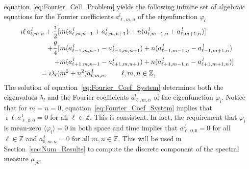 \documentclass[leqno,onefignum,onetabnum]{siamltex1213}
\newcommand{\secref}[1]{Section~\ref{#1}}
\begin{document}
equation~\eqref{eq:Fourier_Cell_Problem} yields the following infinite
set of algebraic equations for the Fourier coefficients $a^l_{\ell,m,n}$
of the eigenfunction $\varphi_l$ 
%
\begin{align}\label{eq:Fourier_Coef_System}
\imath \ell\,a^{\,l}_{\ell,m,n}+\frac{\imath}{2}
[&m(a^{\,l}_{\ell,m,n-1}+a^{\,l}_{\ell,m,n+1})+n(a^{\,l}_{\ell,m-1,n}+a^{\,l}_{\ell,m+1,n})]
\\
+\frac{\theta}{4}[&m(a^{\,l}_{\ell-1,m,n-1}-a^{\,l}_{\ell-1,m,n+1})+n(a^{\,l}_{\ell-1,m-1,n}-a^{\,l}_{\ell-1,m+1,n})
\notag\\
+&m(a^{\,l}_{\ell+1,m,n-1}-a^{\,l}_{\ell+1,m,n+1})+n(a^{\,l}_{\ell+1,m-1,n}-a^{\,l}_{\ell+1,m+1,n})]
\notag\\
=\imath\lambda_l(&m^2+n^2)a^{\,l}_{\ell,m,n}, \qquad \ell,m,n\in\mathbb{Z},
\notag
\end{align}
%
The solution of equation~\eqref{eq:Fourier_Coef_System} determines
both the eigenvalues $\lambda_l$ and the Fourier coefficients $a^l_{\ell,m,n}$
of the eigenfunction $\varphi_l$. Notice that for $m=n=0$,
equation~\eqref{eq:Fourier_Coef_System} implies that
$\imath \ell\,a^{\,l}_{\ell,0,0}=0$ for all $\ell\in\mathbb{Z}$. This is
consistent. In fact, the requirement that $\varphi_l$ is mean-zero $\langle\varphi_l\rangle=0$
in both space and time implies that $a^{\,l}_{\ell,0,0}=0$ for all
$\ell\in\mathbb{Z}$ and $a^{\,l}_{0,m,n}=0$ for all $m,n\in\mathbb{Z}$. This
will be used in \secref{sec:Num_Results} to compute the discrete
component of the spectral measure $\mu_{jk}$.
\end{document}
